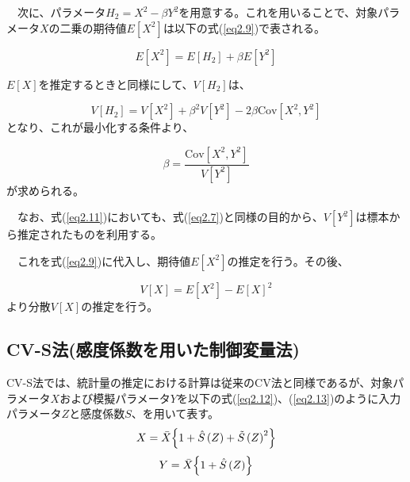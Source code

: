 \documentclass[a4paper,11pt,titlepage,uplatex]{jsreport}
\begin{document}
\begin{itemize}
  　次に、パラメータ$H_2 = X^2 - \beta Y^2$を用意する。これを用いることで、対象パラメータ$X$の二乗の期待値$E\left[X^2\right]$は以下の式(\ref{eq2.9})で表される。

  \begin{equation}
    E\left[X^2\right] = E\left[H_2\right] + \beta E\left[Y^2\right]
    \label{eq2.9}
  \end{equation}

  $E\left[X\right]$を推定するときと同様にして、$V\left[H_2\right]$は、

  \begin{equation}
    V\left[H_2\right] = V\left[X^2\right] + \beta^2 V\left[Y^2\right] - 2\beta \mathrm{Cov}\left[X^2,Y^2\right]
    \label{eq2.10}
  \end{equation}
  となり、これが最小化する条件より、

  \begin{equation}
    \beta = \frac{\mathrm{Cov}\left[X^2,Y^2\right]}{V\left[Y^2\right]}
    \label{eq2.11}
  \end{equation}
  が求められる。
  
  　なお、式(\ref{eq2.11})においても、式(\ref{eq2.7})と同様の目的から、$V\left[Y^2\right]$は標本から推定されたものを利用する。
  
  　これを式(\ref{eq2.9})に代入し、期待値$E\left[X^2\right]$の推定を行う。その後、

  \begin{equation}
    V\left[X\right] = E\left[X^2\right] - E\left[X\right]^2
    \label{eq2.12}
  \end{equation}
  より分散$V\left[X\right]$の推定を行う。

\end{itemize}

\subsection{CV-S法(感度係数を用いた制御変量法)}
CV-S法では、統計量の推定における計算は従来のCV法と同様であるが、対象パラメータ$X$および模擬パラメータ$Y$を以下の式(\ref{eq2.12})、(\ref{eq2.13})のように入力パラメータ$Z$と感度係数$S$、を用いて表す。
\begin{equation}
  X = \bar{X} \Bigl\{ 1 + \hat{S} \left(Z\right) + \tilde{S} \left(Z\right)^2 \Bigr\}
  \label{eq2.12}
\end{equation}
\begin{equation}
  Y = \bar{X} \Bigl\{ 1 + \hat{S} \left(Z\right) \Bigr\}
  \label{eq2.13}
\end{equation}
\end{document}
